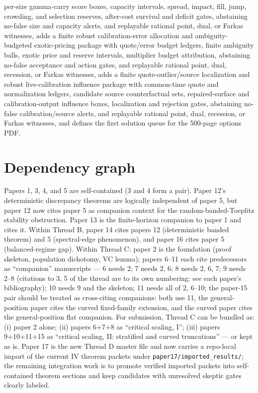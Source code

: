 \documentclass[11pt]{article}
\begin{document}
per-size gamma-carry score boxes, capacity intervals, spread, impact, fill, jump, crowding, and
selection reserves, after-cost survival and deficit gates, abstaining no-false size and capacity
alerts, and replayable rational point, dual, or Farkas witnesses, adds a finite robust
calibration-error allocation and ambiguity-budgeted exotic-pricing package with quote/error budget
ledgers, finite ambiguity balls, exotic price and reserve intervals, multiplier budget attribution,
abstaining no-false acceptance and action gates, and replayable rational point, dual, recession, or
Farkas witnesses, adds a finite quote-outlier/source localization and robust live-calibration
influence package with common-time quote and normalization ledgers, candidate source
counterfactual sets, repaired-surface and calibration-output influence boxes, localization and
rejection gates, abstaining no-false calibration/source alerts, and replayable rational point,
dual, recession, or Farkas witnesses, and
defines the first solution queue for the 500-page options PDF.

\section*{Dependency graph}

Papers 1, 3, 4, and 5 are self-contained (3 and 4 form a pair).  Paper 12's
deterministic discrepancy theorems are logically independent of paper 5, but
paper 12 now cites paper 5 as companion context for the random-banded-Toeplitz
stability obstruction.  Paper 13 is the finite-horizon companion to paper 1 and
cites it.  Within Thread B, paper 14 cites papers 12 (deterministic banded
theorem) and 5 (spectral-edge phenomenon), and paper 16 cites paper 5
(balanced-regime gap).  Within Thread C:
paper 2 is the foundation (proof skeleton, population dichotomy, VC lemma);
papers 6--11 each cite predecessors as ``companion'' manuscripts ---
6 needs 2; 7 needs 2, 6; 8 needs 2, 6, 7; 9 needs 2--8 (citations to 3, 5 of
the thread are to its own numbering: see each paper's bibliography);
10 needs 9 and the skeleton; 11 needs all of 2, 6--10; the paper-15 pair should
be treated as cross-citing companions: both use 11, the general-position paper
cites the curved fixed-family extension, and the curved paper cites the
general-position flat companion.  For submission, Thread
C can be bundled as: (i) paper 2 alone; (ii) papers 6+7+8 as ``critical
scaling, I''; (iii) papers 9+10+11+15 as ``critical scaling, II: stratified
and curved truncations'' --- or kept as is.  Paper 17 is the new Thread D
master file and now carries a repo-local import of the current IV theorem
packets under \texttt{paper17/imported\_results/}; the remaining integration
work is to promote verified imported packets into self-contained theorem
sections and keep candidates with unresolved skeptic gates clearly labeled.
\end{document}
